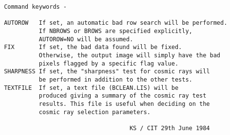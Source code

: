 \begin{description}
\begin{verbatim}
 Command keywords -

 AUTOROW   If set, an automatic bad row search will be performed.
           If NBROWS or BROWS are specified explicitly,
           AUTOROW=NO will be assumed.
 FIX       If set, the bad data found will be fixed.
           Otherwise, the output image will simply have the bad
           pixels flagged by a specific flag value.
 SHARPNESS If set, the "sharpness" test for cosmic rays will
           be performed in addition to the other tests.
 TEXTFILE  If set, a text file (BCLEAN.LIS) will be
           produced giving a summary of the cosmic ray test
           results. This file is useful when deciding on the
           cosmic ray selection parameters.

                                     KS / CIT 29th June 1984
\end{verbatim}
\end{description}
